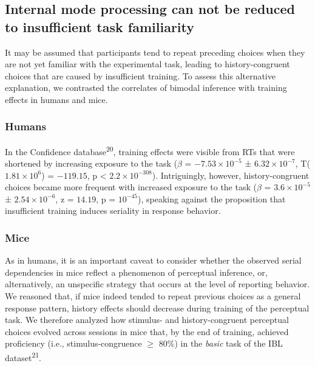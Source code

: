 \documentclass[
]{article}
\begin{document}
\hypertarget{internal-mode-processing-can-not-be-reduced-to-insufficient-task-familiarity}{%
\subsection{Internal mode processing can not be reduced to insufficient
task
familiarity}\label{internal-mode-processing-can-not-be-reduced-to-insufficient-task-familiarity}}

It may be assumed that participants tend to repeat preceding choices
when they are not yet familiar with the experimental task, leading to
history-congruent choices that are caused by insufficient training. To
assess this alternative explanation, we contrasted the correlates of
bimodal inference with training effects in humans and mice.

\hypertarget{humans-1}{%
\subsubsection{Humans}\label{humans-1}}

In the Confidence database\textsuperscript{20}, training effects were
visible from RTs that were shortened by increasing exposure to the task
(\(\beta\) = \(\ensuremath{-7.53\times 10^{-5}}\) ±
\(\ensuremath{6.32\times 10^{-7}}\),
T(\(\ensuremath{1.81\times 10^{6}}\)) = \(-119.15\), p < \(\ensuremath{2.2\times 10^{-308}}\)).
Intriguingly, however, history-congruent choices became more frequent
with increased exposure to the task (\(\beta\) =
\(\ensuremath{3.6\times 10^{-5}}\) ±
\(\ensuremath{2.54\times 10^{-6}}\), z = \(14.19\), p =
\(\ensuremath{10^{-45}}\)), speaking against the proposition that
insufficient training induces seriality in response behavior.

\hypertarget{mice-1}{%
\subsubsection{Mice}\label{mice-1}}

As in humans, it is an important caveat to consider whether the observed
serial dependencies in mice reflect a phenomenon of perceptual
inference, or, alternatively, an unspecific strategy that occurs at the
level of reporting behavior. We reasoned that, if mice indeed tended to
repeat previous choices as a general response pattern, history effects
should decrease during training of the perceptual task. We therefore
analyzed how stimulus- and history-congruent perceptual choices evolved
across sessions in mice that, by the end of training, achieved
proficiency (i.e., stimulus-congruence \(\geq\) 80\%) in the
\emph{basic} task of the IBL dataset\textsuperscript{21}.
\end{document}
